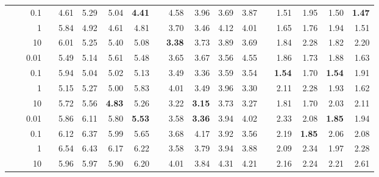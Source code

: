 \documentclass[onefignum,onetabnum]{siamonline190516}
\begin{document}
\begin{table}[htbp]
\begin{tabular}{rcrcrrrrrrrrrrrrrr}
          &       & 0.1   &       &        4.61  &        5.29  &        5.04  &        \bf{4.41}  &       &        4.58  &        3.96  &        3.69  &        3.87  &       &        1.51  &        1.95  &        1.50  &        \bf{1.47}  \\
          &       & 1     &       &        5.84  &        4.92  &        4.61  &        4.81  &       &        3.70  &        3.46  &        4.12  &        4.01  &       &        1.65  &        1.76  &        1.94  &        1.51  \\
          &       & 10    &       &        6.01  &        5.25  &        5.40  &        5.08  &       &        \bf{3.38}  &        3.73  &        3.89  &        3.69  &       &        1.84  &        2.28  &        1.82  &        2.20  \\
\cmidrule(lr){2-18}
          & \parbox[t]{2mm}{}    
                  & 0.01  &       & 5.49  & 5.14  & 5.61  & 5.48  &       & 3.65  & 3.67  & 3.56  & 4.55  &       & 1.86  & 1.73  & 1.88  & 1.63 \\
          &       & 0.1   &       & 5.94  & 5.04  & 5.02  & 5.13  &       & 3.49  & 3.36  & 3.59  & 3.54  &       & \bf{1.54}  & 1.70  & \bf{1.54}  & 1.91 \\
          &       & 1     &       & 5.15  & 5.27  & 5.00  & 5.83  &       & 4.01  & 3.49  & 3.96  & 3.30  &       & 2.11  & 2.28  & 1.93  & 1.62 \\
          &       & 10    &       & 5.72  & 5.56  & \bf{4.83}  & 5.26  &       & 3.22  & \bf{3.15}  & 3.73  & 3.27  &       & 1.81  & 1.70  & 2.03  & 2.11 \\
\cmidrule(lr){2-18}
          & \parbox[t]{2mm}{} 
                  & 0.01  &       & 5.86  & 6.11  & 5.80   & \bf{5.53}  &       & 3.58  & \bf{3.36}  & 3.94  & 4.02  &       & 2.33  & 2.08  & \bf{1.85}  & 1.94 \\
          &       & 0.1   &       & 6.12  & 6.37  & 5.99  & 5.65  &       & 3.68  & 4.17  & 3.92  & 3.56  &       & 2.19  & \bf{1.85}  & 2.06  & 2.08 \\
          &       & 1     &       & 6.54  & 6.43  & 6.17  & 6.22  &       & 3.58  & 3.79  & 3.94  & 3.88  &       & 2.09  & 2.34  & 1.97  & 2.28 \\
          &       & 10    &       & 5.96  & 5.97  & 5.90   & 6.20   &       & 4.01  & 3.84  & 4.31  & 4.21  &       & 2.16  & 2.24  & 2.21  & 2.61 \\

\end{tabular}
\end{table}
\end{document}
